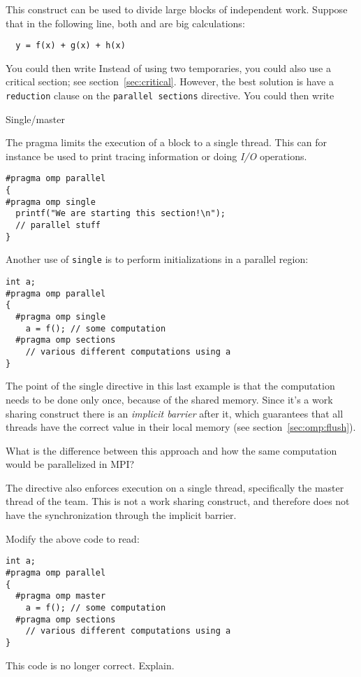This construct can be used to divide large blocks of independent work.
Suppose that in the following line, both  and 
are big calculations:
\begin{lstlisting}
  y = f(x) + g(x) + h(x)
\end{lstlisting}
You could then write
Instead of using two temporaries, you could also use a critical
section; see section~\ref{sec:critical}.  However, the best solution
is have a \lstinline{reduction} clause on the \lstinline{parallel sections} directive.
You could then write

 {Single/master}
\label{sec:omp-single}

The  pragma
limits the execution of a block to a single thread. 
This can for instance be used to print tracing information
or doing \emph{I/O} operations.
\begin{lstlisting}
#pragma omp parallel
{
#pragma omp single
  printf("We are starting this section!\n");
  // parallel stuff
}
\end{lstlisting}
Another use of \lstinline{single} is to perform initializations
in a parallel region:
\begin{lstlisting}
int a;
#pragma omp parallel
{
  #pragma omp single
    a = f(); // some computation
  #pragma omp sections
    // various different computations using a
}
\end{lstlisting}

The point of the single directive in this last example is that the
computation needs to be done only once, because of the shared memory.
Since it's a work sharing construct there is an \emph{implicit
  barrier} after it,
which guarantees that all threads have the correct value in their
local memory (see section~\ref{sec:omp:flush}).

\begin{exercise}
  \label{ex:omp-single-mpi}
  What is the difference between this approach and how the same
  computation would be parallelized in MPI?
\end{exercise}

The  directive also enforces execution
on a single thread, specifically the master thread of the team.
This is not a work sharing construct, and therefore
does not have the synchronization through the implicit barrier.

\begin{exercise}
  Modify the above code to read:
\begin{lstlisting}
int a;
#pragma omp parallel
{
  #pragma omp master
    a = f(); // some computation
  #pragma omp sections
    // various different computations using a
}
\end{lstlisting}
  This code is no longer correct. Explain.
\end{exercise}

